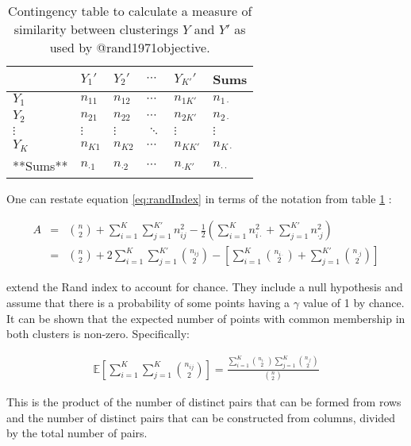\documentclass[
]{book}
\begin{document}
\begin{table}

\caption{\label{tab:randContingency}Contingency table to calculate a measure of similarity between clusterings $Y$ and $Y'$ as used by @rand1971objective.}
\centering
\begin{tabular}[t]{llllll}
\toprule
  & $Y_1'$ & $Y_2'$ & $\cdots$ & $Y_{K'}'$ & Sums\\
\midrule
$Y_1$ & $n_{11}$ & $n_{12}$ & $\cdots$ & $n_{1K'}$ & $n_{1 \cdot}$\\
$Y_2$ & $n_{21}$ & $n_{22}$ & $\cdots$ & $n_{2K'}$ & $n_{2 \cdot}$\\
$\vdots$ & $\vdots$ & $\vdots$ & $\ddots$ & $\vdots$ & $\vdots$\\
$Y_K$ & $n_{K1}$ & $n_{K2}$ & $\cdots$ & $n_{KK'}$ & $n_{K \cdot}$\\
**Sums** & $n_{\cdot 1}$ & $n_{\cdot 2}$ & $\cdots$ & $n_{\cdot K'}$ & $n_{\cdot \cdot}$\\
\bottomrule
\end{tabular}
\end{table}

One can restate equation \eqref{eq:randIndex} in terms of the notation from table \ref{tab:randContingency} \citep{brennan1974measuring}:

\begin{eqnarray}
    A &=& \binom{n}{2} + \sum_{i=1}^K\sum_{j=1}^{K'}n_{ij}^2 - \frac{1}{2}\left(\sum_{i=1}^K n_{i\cdot}^2 + \sum_{j=1}^{K'}n_{\cdot j}^2  \right) \\
    &=& \binom{n}{2} + 2 \sum_{i=1}^{K}\sum_{j=1}^{K'}\binom{n_{ij}}{2} - \left[\sum_{i=1}^{K}\binom{n_{i \cdot}}{2} + \sum_{j=1}^{K'}\binom{n_{\cdot j}}{2}\right]%
    \label{eq:randIndex2}
\end{eqnarray}

\citet{hubert1985comparing} extend the Rand index to account for chance. They include a null hypothesis and assume that there is a probability of some points having a \(\gamma\) value of 1 by chance. It can be shown that the expected number of points with common membership in both clusters is non-zero. Specifically:

\begin{eqnarray}
    \mathbb{E}\left[\sum_{i=1}^K \sum_{j=1}^K\binom{n_{ij}}{2}\right] = \frac{\sum_{i=1}^K \binom{n_{i\cdot}}{2} \sum_{j=1}^K \binom{n_{\cdot j}}{2}}{\binom{n}{2}}
\end{eqnarray}

This is the product of the number of distinct pairs that can be formed from rows and the number of distinct pairs that can be constructed from columns, divided by the total number of pairs.
\end{document}
